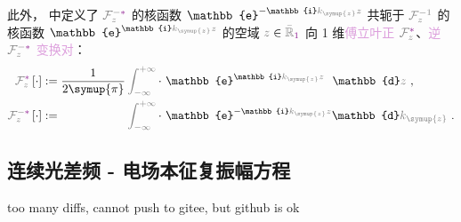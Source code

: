此外， 中定义了 $\mathcolor{gray}{\mathcal F_{z}^{-\mathcolor{Plum}{*}}}$ 的核函数 $\mathbb{e}^{-\mathbb{i}\mathcolor{gray}{k_{\symup{z}}} \mathcolor{gray}{z}}$ 共轭于 $\mathcolor{gray}{\mathcal F_{z}^{-1}}$ 的核函数 $\mathbb{e}^{\mathbb{i}\mathcolor{gray}{k_{\symup{z}}} \mathcolor{gray}{z}}$ 的空域 $\mathcolor{gray}{z} \in \mathcolor{gray}{\bar{\mathbb{R}}_{\textcolor{Plum}{1}}}$ 向 1 维\textcolor{Plum}{傅立叶正} $\mathcolor{gray}{\mathcal F_{z}^{\mathcolor{Plum}{*}}}$、\textcolor{Plum}{逆} $\mathcolor{gray}{\mathcal F_{z}^{-\mathcolor{Plum}{*}}}$ \textcolor{Plum}{变换对}：
\begin{subequations} \label{eq:FT*-z_kz}
\begin{align}
	\mathcolor{gray}{\mathcal F_{z}^{\mathcolor{Plum}{*}}} \left[ \cdot \right] &:= \frac{ 1 }{ 2\symup{\pi} } \mathcolor{gray}{\int_{-\infty}^{+\infty}} \cdot~ \mathbb{e}^{\mathbb{i}\mathcolor{gray}{k_{\symup{z}}} \mathcolor{gray}{z}} \hphantom{^-} \mathbb{d}\mathcolor{gray}{z} ~, \label{eq:FT*-kz} \\
	\mathcolor{gray}{\mathcal F_{z}^{-\mathcolor{Plum}{*}}} \left[ \cdot \right] &:= \hphantom{\frac{ 1 }{ 2\symup{\pi} }} \mathcolor{gray}{\int_{-\infty}^{+\infty}} \cdot~ \mathbb{e}^{-\mathbb{i}\mathcolor{gray}{k_{\symup{z}}} \mathcolor{gray}{z}} \mathbb{d}\mathcolor{gray}{k_{\symup{z}}} ~. \label{eq:IFT*-z}
\end{align}
\end{subequations}

\subsection{连续光差频 - 电场本征复振幅方程}\label{ssec:DFG_discrete}

\cite{dregerSecondharmonicGenerationNonlinear1990,zubairyAnalyticApproachSecondharmonic1985}

too many diffs, cannot push to gitee, but github is ok

\cite{katoSecondharmonicGeneration20481986,katoTemperaturetuned90Phasematching1994,brunerTemperaturedependentSellmeierEquation2003,jundtTemperaturedependentSellmeierEquation1997,katoSellmeierThermoopticDispersion2002}

